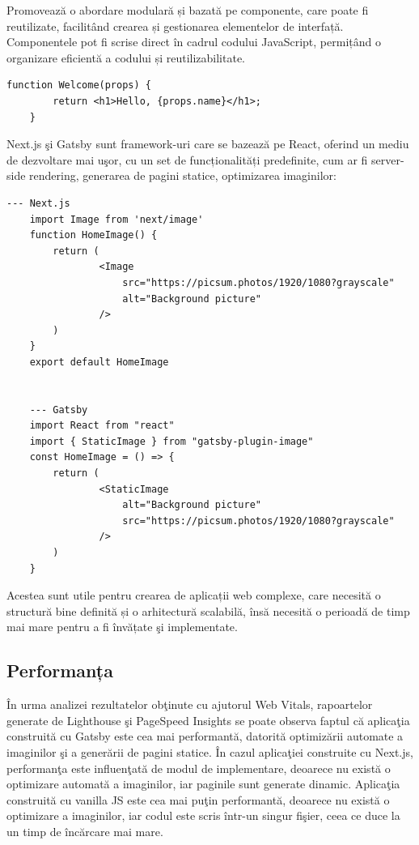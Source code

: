 \documentclass[12pt, a4paper]{report}
\begin{document}
Promovează o abordare modulară și bazată pe componente, care poate fi reutilizate, facilit\^and crearea și gestionarea elementelor de interfață. Componentele pot fi scrise direct în cadrul codului JavaScript, permițând o organizare eficientă a codului și reutilizabilitate.

\begin{lstlisting}[caption={Exemplu de component\u a React},captionpos=b]
	function Welcome(props) {
		return <h1>Hello, {props.name}</h1>;
	}
\end{lstlisting}

Next.js \c si Gatsby sunt framework-uri care se bazeaz\u a pe React, oferind un mediu de dezvoltare mai u\c sor, cu un set de funcționalități predefinite, cum ar fi server-side rendering, generarea de pagini statice, optimizarea imaginilor:

\begin{lstlisting}[caption={Exemplu de utilizare a unei imagini optimizate automat \^in Next.js \c si Gatsby},captionpos=b]
	--- Next.js
	import Image from 'next/image'
	function HomeImage() {
		return (
				<Image
					src="https://picsum.photos/1920/1080?grayscale"
					alt="Background picture"
				/>
		)
	}
	export default HomeImage

	
	--- Gatsby
	import React from "react"
	import { StaticImage } from "gatsby-plugin-image"
	const HomeImage = () => {
		return (
				<StaticImage
					alt="Background picture"
					src="https://picsum.photos/1920/1080?grayscale"
				/>
		)
	}
\end{lstlisting} \label{fig:image-optimization}

Acestea sunt utile pentru crearea de aplicații web complexe, care necesită o structură bine definită și o arhitectură scalabilă, \^ins\u a necesit\u a o perioad\u a de timp mai mare pentru a fi \^inv\u ațate \c si implementate.

\subsection{Performanța}

\^In urma analizei rezultatelor ob\c tinute cu ajutorul Web Vitals, rapoartelor generate de Lighthouse \c si PageSpeed Insights se poate observa faptul c\u a aplica\c tia construit\u a cu Gatsby este cea mai performant\u a, datorit\u a optimiz\u arii automate a imaginilor \c si a gener\u arii de pagini statice. \^In cazul aplica\c tiei construite cu Next.js, performan\c ta este influen\c tat\u a de modul de implementare, deoarece nu exist\u a o optimizare automat\u a a imaginilor, iar paginile sunt generate dinamic. Aplica\c tia construit\u a cu vanilla JS este cea mai pu\c tin performant\u a, deoarece nu exist\u a o optimizare a imaginilor, iar codul este scris \^intr-un singur fi\c sier, ceea ce duce la un timp de \^inc\u arcare mai mare.
\end{document}
